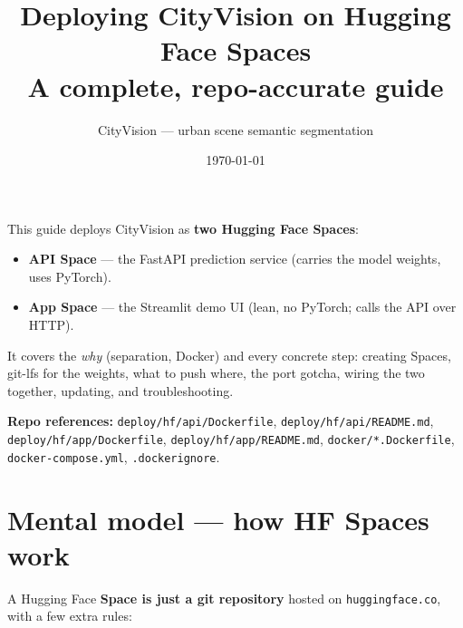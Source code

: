 \documentclass[11pt]{article}
\title{\vspace{-1.2cm}\textbf{\color{cvblue}Deploying CityVision on Hugging Face Spaces}\\[2pt]
\large A complete, repo-accurate guide}
\author{CityVision — urban scene semantic segmentation}
\date{\today}
\newcommand{\code}[1]{\lstinline[basicstyle=\ttfamily\normalsize]|#1|}
\begin{document}
\maketitle
\vspace{-0.6cm}

\noindent
This guide deploys CityVision as \textbf{two Hugging Face Spaces}:
\begin{itemize}
  \item \textbf{API Space} — the FastAPI prediction service (carries the model
    weights, uses PyTorch).
  \item \textbf{App Space} — the Streamlit demo UI (lean, no PyTorch; calls the API
    over HTTP).
\end{itemize}
It covers the \emph{why} (separation, Docker) and every concrete step: creating
Spaces, git-lfs for the weights, what to push where, the port gotcha, wiring the
two together, updating, and troubleshooting.

\medskip
\noindent\textbf{Repo references:} \code{deploy/hf/api/Dockerfile},
\code{deploy/hf/api/README.md}, \code{deploy/hf/app/Dockerfile},
\code{deploy/hf/app/README.md}, \code{docker/*.Dockerfile},
\code{docker-compose.yml}, \code{.dockerignore}.

\section{Mental model — how HF Spaces work}

A Hugging Face \textbf{Space is just a git repository} hosted on
\code{huggingface.co}, with a few extra rules:
\end{document}
